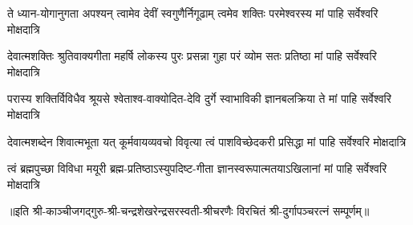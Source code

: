 

\fourlineindentedshloka
{ते ध्यान-योगानुगता अपश्यन्}
{त्वामेव देवीं स्वगुणैर्निगूढाम्}
{त्वमेव शक्तिः परमेश्वरस्य}
{मां पाहि सर्वेश्वरि मोक्षदात्रि}%

\fourlineindentedshloka
{देवात्मशक्तिः श्रुतिवाक्यगीता}
{महर्षि लोकस्य पुरः प्रसन्ना}
{गुहा परं व्योम सतः प्रतिष्ठा}
{मां पाहि सर्वेश्वरि मोक्षदात्रि}%

\fourlineindentedshloka
{परास्य शक्तिर्विविधैव श्रूयसे}
{श्वेताश्व-वाक्योदित-देवि दुर्गे}
{स्वाभाविकी ज्ञानबलक्रिया ते}
{मां पाहि सर्वेश्वरि मोक्षदात्रि}%

\fourlineindentedshloka
{देवात्मशब्देन शिवात्मभूता}
{यत् कूर्मवायव्यवचो विवृत्या}
{त्वं पाशविच्छेदकरी प्रसिद्धा}
{मां पाहि सर्वेश्वरि मोक्षदात्रि}%

\fourlineindentedshloka
{त्वं ब्रह्मपुच्छा विविधा मयूरी}
{ब्रह्म-प्रतिष्ठाऽस्युपदिष्ट-गीता}
{ज्ञानस्वरूपात्मतयाऽखिलानां}
{मां पाहि सर्वेश्वरि मोक्षदात्रि}%

{॥इति श्री-काञ्चीजगद्गुरु-श्री-चन्द्रशेखरेन्द्रसरस्वती-श्रीचरणैः विरचितं श्री-दुर्गापञ्चरत्नं सम्पूर्णम्॥}

